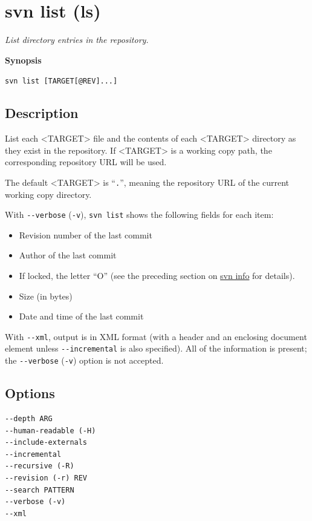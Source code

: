 \section{svn list (ls)}\label{svn.ref.svn.c.list}

\emph{List directory entries in the repository.}

\textbf{Synopsis}

\texttt{svn\ list\ {[}TARGET{[}@REV{]}...{]}}

\subsection{Description}

List each \textless TARGET\textgreater{} file and the contents of each
\textless TARGET\textgreater{} directory as they exist in the
repository. If \textless TARGET\textgreater{} is a working copy path,
the corresponding repository URL will be used.

The default \textless TARGET\textgreater{} is ``\texttt{.}'', meaning
the repository URL of the current working copy directory.

With \texttt{-\/-verbose} (\texttt{-v}), \texttt{svn\ list} shows the
following fields for each item:

\begin{itemize}
\item
  Revision number of the last commit
\item
  Author of the last commit
\item
  If locked, the letter ``O'' (see the preceding section on
  \hyperref[svn.ref.svn.c.info]{svn info} for details).
\item
  Size (in bytes)
\item
  Date and time of the last commit
\end{itemize}

With \texttt{-\/-xml}, output is in XML format (with a header and an
enclosing document element unless \texttt{-\/-incremental} is also
specified). All of the information is present; the \texttt{-\/-verbose}
(\texttt{-v}) option is not accepted.

\subsection{Options}

\begin{verbatim}
--depth ARG
--human-readable (-H)
--include-externals
--incremental
--recursive (-R)
--revision (-r) REV
--search PATTERN
--verbose (-v)
--xml
\end{verbatim}

